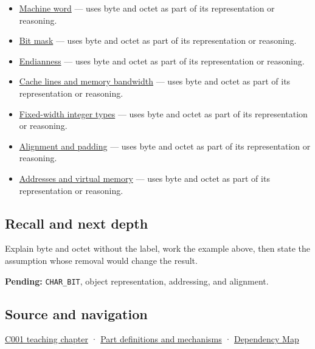 \begin{itemize}
\tightlist
\item
  \hyperref[appendix-d67a19507dc5]{Machine word} --- uses byte and octet as part of its representation or reasoning.
\item
  \hyperref[appendix-dbe5905163c2]{Bit mask} --- uses byte and octet as part of its representation or reasoning.
\item
  \hyperref[appendix-bc07c3d25b18]{Endianness} --- uses byte and octet as part of its representation or reasoning.
\item
  \hyperref[appendix-e4ccdbab8320]{Cache lines and memory bandwidth} --- uses byte and octet as part of its representation or reasoning.
\item
  \hyperref[appendix-cc04044b5782]{Fixed-width integer types} --- uses byte and octet as part of its representation or reasoning.
\item
  \hyperref[appendix-a1f7c53b4742]{Alignment and padding} --- uses byte and octet as part of its representation or reasoning.
\item
  \hyperref[appendix-18ee4f913c3c]{Addresses and virtual memory} --- uses byte and octet as part of its representation or reasoning.
\end{itemize}

\subsection{Recall and next depth}\label{appendix-5bee2df85484-recall-and-next-depth}

Explain byte and octet without the label, work the example above, then state the assumption whose removal would change the result.

\textbf{Pending:} \texttt{CHAR\_BIT}, object representation, addressing, and alignment.

\subsection{Source and navigation}\label{appendix-5bee2df85484-source-and-navigation}

\hyperref[01-foundations-i-ch001-from-a-signal-to-an-interpretation]{C001 teaching chapter} · \hyperref[appendix-fd090d982a15]{Part definitions and mechanisms} · \hyperref[appendix-4ad47bdd269a]{Dependency Map}
